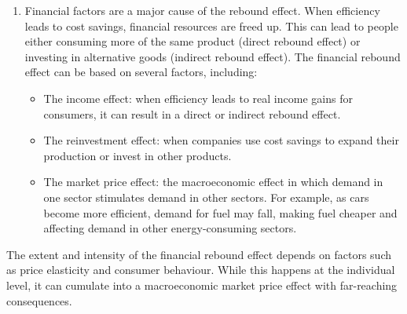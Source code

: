 \documentclass[
  a4paper,
  openany]{book}
\providecommand{\tightlist}{%
  \setlength{\itemsep}{0pt}\setlength{\parskip}{0pt}}
\begin{document}
\begin{enumerate}
\def\labelenumi{\arabic{enumi}.}
\tightlist
\item
  Financial factors are a major cause of the rebound effect. When
  efficiency leads to cost savings, financial resources are freed up.
  This can lead to people either consuming more of the same product
  (direct rebound effect) or investing in alternative goods (indirect
  rebound effect). The financial rebound effect can be based on several
  factors, including:

  \begin{itemize}
  \item
    The income effect: when efficiency leads to real income gains for
    consumers, it can result in a direct or indirect rebound effect.
  \item
    The reinvestment effect: when companies use cost savings to expand
    their production or invest in other products.
  \item
    The market price effect: the macroeconomic effect in which demand in
    one sector stimulates demand in other sectors. For example, as cars
    become more efficient, demand for fuel may fall, making fuel cheaper
    and affecting demand in other energy-consuming sectors.
  \end{itemize}
\end{enumerate}

The extent and intensity of the financial rebound effect depends on
factors such as price elasticity and consumer behaviour. While this
happens at the individual level, it can cumulate into a macroeconomic
market price effect with far-reaching consequences.
\end{document}
